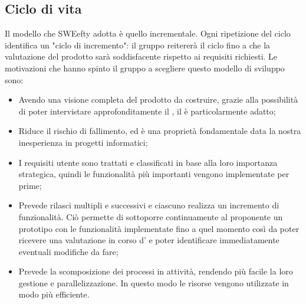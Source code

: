 	\subsection{Ciclo di vita}	
	Il modello che SWEefty adotta è quello incrementale. Ogni ripetizione del ciclo identifica un "ciclo di incremento": il gruppo reitererà il ciclo fino a che la valutazione del prodotto sarà soddisfacente rispetto ai requisiti richiesti.
	Le motivazioni che hanno spinto il gruppo a scegliere questo modello di sviluppo sono:
	\begin{itemize}
		\item Avendo una visione completa del prodotto da costruire, grazie alla possibilità di poter intervistare approfonditamente il , il  è particolarmente adatto;
		\item Riduce il rischio di fallimento, ed è una proprietà fondamentale data la nostra inesperienza in progetti informatici;
		\item I requisiti utente sono trattati e classificati in base alla loro importanza strategica, quindi le funzionalità più importanti vengono implementate per prime;
		\item Prevede rilasci multipli e successivi e ciascuno realizza un incremento di funzionalità. Ciò permette di sottoporre continuamente al proponente un prototipo con le funzionalità implementate fino a quel momento così da poter ricevere una valutazione in corso d' e poter identificare immediatamente eventuali modifiche da fare;
		\item Prevede la scomposizione dei processi in attività, rendendo più facile la loro gestione e parallelizzazione. In questo modo le risorse vengono utilizzate in modo più efficiente.
	\end{itemize}
